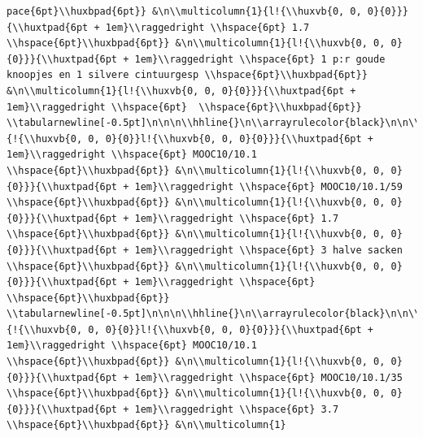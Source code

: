 \documentclass[11pt,preprint, authoryear]{elsarticle}
\numberwithin{equation}{section}
\numberwithin{figure}{section}
\numberwithin{table}{section}
\begin{document}
\begin{verbatim}
pace{6pt}\\huxbpad{6pt}} &\n\\multicolumn{1}{l!{\\huxvb{0, 0, 0}{0}}}{\\huxtpad{6pt + 1em}\\raggedright \\hspace{6pt} 1.7 \\hspace{6pt}\\huxbpad{6pt}} &\n\\multicolumn{1}{l!{\\huxvb{0, 0, 0}{0}}}{\\huxtpad{6pt + 1em}\\raggedright \\hspace{6pt} 1 p:r goude knoopjes en 1 silvere cintuurgesp \\hspace{6pt}\\huxbpad{6pt}} &\n\\multicolumn{1}{l!{\\huxvb{0, 0, 0}{0}}}{\\huxtpad{6pt + 1em}\\raggedright \\hspace{6pt}  \\hspace{6pt}\\huxbpad{6pt}} \\tabularnewline[-0.5pt]\n\n\n\\hhline{}\n\\arrayrulecolor{black}\n\n\\multicolumn{1}{!{\\huxvb{0, 0, 0}{0}}l!{\\huxvb{0, 0, 0}{0}}}{\\huxtpad{6pt + 1em}\\raggedright \\hspace{6pt} MOOC10/10.1 \\hspace{6pt}\\huxbpad{6pt}} &\n\\multicolumn{1}{l!{\\huxvb{0, 0, 0}{0}}}{\\huxtpad{6pt + 1em}\\raggedright \\hspace{6pt} MOOC10/10.1/59 \\hspace{6pt}\\huxbpad{6pt}} &\n\\multicolumn{1}{l!{\\huxvb{0, 0, 0}{0}}}{\\huxtpad{6pt + 1em}\\raggedright \\hspace{6pt} 1.7 \\hspace{6pt}\\huxbpad{6pt}} &\n\\multicolumn{1}{l!{\\huxvb{0, 0, 0}{0}}}{\\huxtpad{6pt + 1em}\\raggedright \\hspace{6pt} 3 halve sacken \\hspace{6pt}\\huxbpad{6pt}} &\n\\multicolumn{1}{l!{\\huxvb{0, 0, 0}{0}}}{\\huxtpad{6pt + 1em}\\raggedright \\hspace{6pt}  \\hspace{6pt}\\huxbpad{6pt}} \\tabularnewline[-0.5pt]\n\n\n\\hhline{}\n\\arrayrulecolor{black}\n\n\\multicolumn{1}{!{\\huxvb{0, 0, 0}{0}}l!{\\huxvb{0, 0, 0}{0}}}{\\huxtpad{6pt + 1em}\\raggedright \\hspace{6pt} MOOC10/10.1 \\hspace{6pt}\\huxbpad{6pt}} &\n\\multicolumn{1}{l!{\\huxvb{0, 0, 0}{0}}}{\\huxtpad{6pt + 1em}\\raggedright \\hspace{6pt} MOOC10/10.1/35 \\hspace{6pt}\\huxbpad{6pt}} &\n\\multicolumn{1}{l!{\\huxvb{0, 0, 0}{0}}}{\\huxtpad{6pt + 1em}\\raggedright \\hspace{6pt} 3.7 \\hspace{6pt}\\huxbpad{6pt}} &\n\\multicolumn{1}
\end{verbatim}
\end{document}
